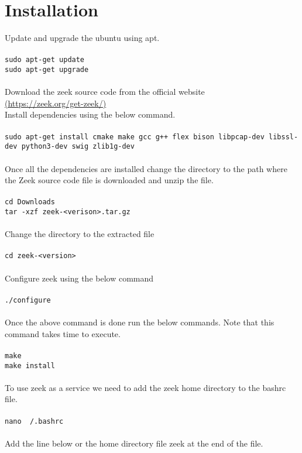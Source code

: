 
\section{Installation}
Update and upgrade the ubuntu using apt.\\\\
\texttt{sudo apt-get update}\\
\texttt{sudo apt-get upgrade}\\\\
Download the zeek source code from the official website\\
\href{https://zeek.org/get-zeek/}{(https://zeek.org/get-zeek/)}\\
Install dependencies using the below command.\\\\
\texttt{sudo apt-get install cmake make gcc g++ flex bison libpcap-dev libssl-dev python3-dev swig zlib1g-dev}\\\\
Once all the dependencies are installed change the directory to the path where the Zeek source code file is downloaded and unzip the file.\\\\
\texttt{cd Downloads}\\
\texttt{tar -xzf zeek-<verison>.tar.gz}\\\\
Change the directory to the extracted file\\\\
\texttt{cd zeek-<version>}\\\\
Configure zeek using the below command\\\\
\texttt{./configure}\\\\
Once the above command is done run the below commands. Note that this command takes time to execute.\\\\
\texttt{make}\\
\texttt{make install}\\\\
To use zeek as a service we need to add the zeek home directory to the bashrc file.
\\\\
\texttt{nano ~/.bashrc}
\\\\
Add the line below or the home directory file zeek at the end of the file.
